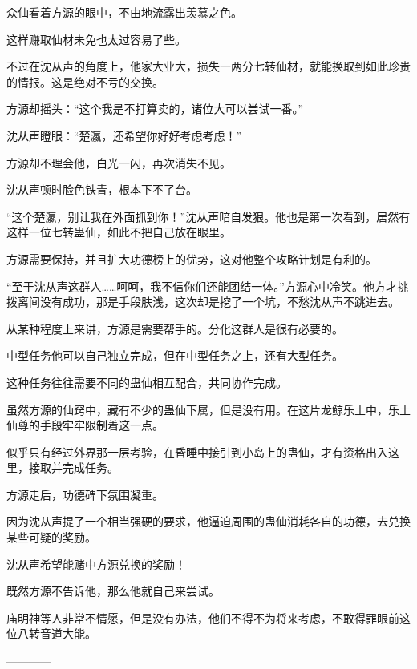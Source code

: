 \begin{this_body}
众仙看着方源的眼中，不由地流露出羡慕之色。

这样赚取仙材未免也太过容易了些。

不过在沈从声的角度上，他家大业大，损失一两分七转仙材，就能换取到如此珍贵的情报。这是绝对不亏的交换。

方源却摇头：“这个我是不打算卖的，诸位大可以尝试一番。”

沈从声瞪眼：“楚瀛，还希望你好好考虑考虑！”

方源却不理会他，白光一闪，再次消失不见。

沈从声顿时脸色铁青，根本下不了台。

“这个楚瀛，别让我在外面抓到你！”沈从声暗自发狠。他也是第一次看到，居然有这样一位七转蛊仙，如此不把自己放在眼里。

方源需要保持，并且扩大功德榜上的优势，这对他整个攻略计划是有利的。

“至于沈从声这群人……呵呵，我不信你们还能团结一体。”方源心中冷笑。他方才挑拨离间没有成功，那是手段肤浅，这次却是挖了一个坑，不愁沈从声不跳进去。

从某种程度上来讲，方源是需要帮手的。分化这群人是很有必要的。

中型任务他可以自己独立完成，但在中型任务之上，还有大型任务。

这种任务往往需要不同的蛊仙相互配合，共同协作完成。

虽然方源的仙窍中，藏有不少的蛊仙下属，但是没有用。在这片龙鲸乐土中，乐土仙尊的手段牢牢限制着这一点。

似乎只有经过外界那一层考验，在昏睡中接引到小岛上的蛊仙，才有资格出入这里，接取并完成任务。

方源走后，功德碑下氛围凝重。

因为沈从声提了一个相当强硬的要求，他逼迫周围的蛊仙消耗各自的功德，去兑换某些可疑的奖励。

沈从声希望能赌中方源兑换的奖励！

既然方源不告诉他，那么他就自己来尝试。

庙明神等人非常不情愿，但是没有办法，他们不得不为将来考虑，不敢得罪眼前这位八转音道大能。

------------

\end{this_body}

